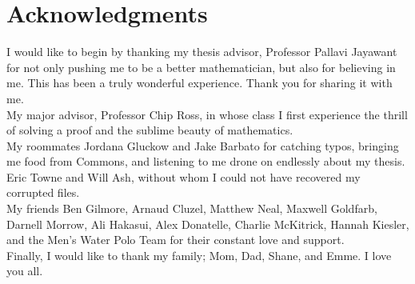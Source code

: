 \chapter*{Acknowledgments}

I would like to begin by thanking my thesis advisor, Professor Pallavi Jayawant for not only pushing me to be a better mathematician, but also for believing in me. This has been a truly wonderful experience. Thank you for sharing it with me.\\

My major advisor, Professor Chip Ross, in whose class I first experience the thrill of solving a proof and the sublime beauty of mathematics.\\

My roommates Jordana Gluckow and Jake Barbato for catching typos, bringing me food from Commons, and listening to me drone on endlessly about my thesis.\\

Eric Towne and Will Ash, without whom I could not have recovered my corrupted files.\\

My friends Ben Gilmore, Arnaud Cluzel, Matthew Neal, Maxwell Goldfarb, Darnell Morrow, Ali Hakasui, Alex Donatelle, Charlie McKitrick, Hannah Kiesler, and the Men's Water Polo Team for their constant love and support.\\

Finally, I would like to thank my family; Mom, Dad, Shane, and Emme. I love you all. 